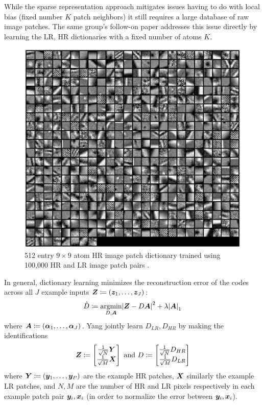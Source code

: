 While the sparse representation approach mitigates issues having to do with local bias (fixed number \(K\) patch neighbors) it still requires a large database of raw image patches.
%
The same group's follow-on paper \cite{yang2010} addresses this issue directly by learning the LR, HR dictionaries with a fixed number of atoms \(K\).
\begin{figure}[!htbp]
    \centering
    \includegraphics[width=\linewidth,keepaspectratio]{figures/classical/dictpatches.png}
    \caption{512 entry \(9 \times 9\) atom HR image patch dictionary trained using 100,000 HR and LR image patch pairs \cite{yang2010}.}
    \label{fig:hrpatchdict}
\end{figure}
%
In general, dictionary learning minimizes the reconstruction error of the codes across all \(J\) example inputs \(\bm{Z} \coloneqq \left( \bm{z}_1, \mathellipsis, \bm{z}_J \right)\):
\begin{equation}
    \hat{D} \coloneqq \underset{D, \bm{A}}{\text{argmin}} \abs{ \bm{Z} - D\bm{A} }^2 + \lambda \abs{ \bm{A} }_1
\end{equation}
where \(\bm{A} \coloneqq \left( \bm{\alpha}_1, \mathellipsis, \bm{\alpha}_J  \right)\).
%
Yang \etal jointly learn \(D_{LR}, D_{HR}\) by making the identifications
\begin{equation*}
    \bm{Z} \coloneqq \begin{bmatrix}
        \frac{1}{\sqrt{N}}\bm{Y} \\ \frac{1}{\sqrt{M}} \bm{X}
    \end{bmatrix} \text{ and }
    D \coloneqq \begin{bmatrix}
        \frac{1}{\sqrt{N}} D_{HR} \\ \frac{1}{\sqrt{M}} D_{LR}
    \end{bmatrix}
\end{equation*}
where \(\bm{Y} \coloneqq \left( \bm{y}_1, \mathellipsis, \bm{y}_P \right)\) are the example HR patches, \(\bm{X}\) similarly the example LR patches, and \(N, M\) are the number of HR and LR pixels respectively in each example patch pair \(\bm{y}_i, \bm{x}_i\) (in order to normalize the error between \(\bm{y}_i, \bm{x}_i\)).

